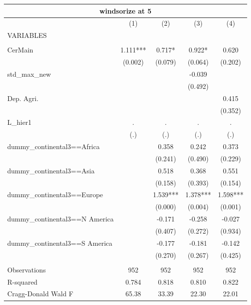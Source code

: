 \begin{tabular}{lcccc}
\multicolumn{5}{c}{windsorize at 5} \\ \hline
 & (1) & (2) & (3) & (4) \\
VARIABLES &  &  &  &  \\ \hline
 &  &  &  &  \\
CerMain & 1.111*** & 0.717* & 0.922* & 0.620 \\
 & (0.002) & (0.079) & (0.064) & (0.202) \\
std\_max\_new &  &  & -0.039 &  \\
 &  &  & (0.492) &  \\
Dep. Agri. &  &  &  & 0.415 \\
 &  &  &  & (0.352) \\
L\_hier1 & . & . & . & . \\
 & (.) & (.) & (.) & (.) \\
dummy\_continental3==Africa &  & 0.358 & 0.242 & 0.373 \\
 &  & (0.241) & (0.490) & (0.229) \\
dummy\_continental3==Asia &  & 0.518 & 0.368 & 0.551 \\
 &  & (0.158) & (0.393) & (0.154) \\
dummy\_continental3==Europe &  & 1.539*** & 1.378*** & 1.598*** \\
 &  & (0.000) & (0.004) & (0.001) \\
dummy\_continental3==N America &  & -0.171 & -0.258 & -0.027 \\
 &  & (0.407) & (0.272) & (0.934) \\
dummy\_continental3==S America &  & -0.177 & -0.181 & -0.142 \\
 &  & (0.270) & (0.267) & (0.425) \\
 &  &  &  &  \\
Observations & 952 & 952 & 952 & 952 \\
R-squared & 0.784 & 0.818 & 0.810 & 0.822 \\
 Cragg-Donald Wald F & 65.38 & 33.39 & 22.30 & 22.01 \\ \hline
\end{tabular}
